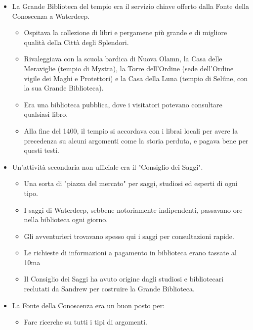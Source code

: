 \documentclass{article}
\begin{document}
              \begin{itemize}
                \item La Grande Biblioteca del tempio era il servizio chiave offerto dalla Fonte della Conoscenza a Waterdeep.
                \begin{itemize}
                    \item Ospitava la collezione di libri e pergamene più grande e di migliore qualità della Città degli Splendori.
                    \item Rivaleggiava con la scuola bardica di Nuova Olamn, la Casa delle Meraviglie (tempio di Mystra), la Torre dell'Ordine (sede dell'Ordine vigile dei Maghi e Protettori) e la Casa della Luna (tempio di Selûne, con la sua Grande Biblioteca).
                    \item Era una biblioteca pubblica, dove i visitatori potevano consultare qualsiasi libro.
                    \item Alla fine del 1400, il tempio si accordava con i librai locali per avere la precedenza su alcuni argomenti come la storia perduta, e pagava bene per questi testi.
                \end{itemize}
                \item Un'attività secondaria non ufficiale era il "Consiglio dei Saggi".
                \begin{itemize}
                    \item Una sorta di "piazza del mercato" per saggi, studiosi ed esperti di ogni tipo.
                    \item I saggi di Waterdeep, sebbene notoriamente indipendenti, passavano ore nella biblioteca ogni giorno.
                    \item Gli avventurieri trovavano spesso qui i saggi per consultazioni rapide.
                    \item Le richieste di informazioni a pagamento in biblioteca erano tassate al 10ma%
                    \item Il Consiglio dei Saggi ha avuto origine dagli studiosi e bibliotecari reclutati da Sandrew per costruire la Grande Biblioteca.
                \end{itemize}
                \item La Fonte della Conoscenza era un buon posto per:
                \begin{itemize}
                    \item Fare ricerche su tutti i tipi di argomenti.

\end{itemize}
\end{itemize}
\end{document}
